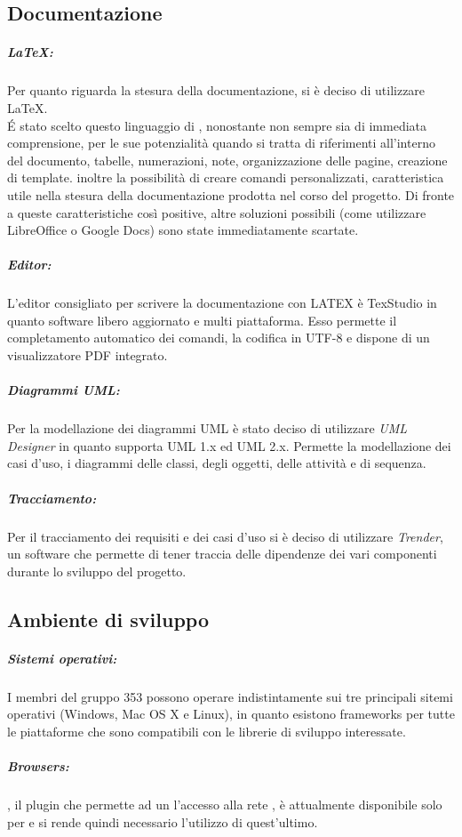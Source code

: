 \documentclass[NormeDiProgetto.tex]{subfiles}
\begin{document}
	\subsection{Documentazione}
	\subparagraph{\LaTeX:} Per quanto riguarda la stesura della documentazione, si è deciso di
		utilizzare \LaTeX. \\
		\'{E}	stato scelto questo linguaggio di , nonostante
		non sempre sia di immediata comprensione, per le sue potenzialità quando
		si tratta di riferimenti all'interno del documento, tabelle, numerazioni,
		note, organizzazione delle pagine, creazione di template. inoltre
		la possibilità di creare comandi personalizzati, caratteristica utile nella
		stesura della documentazione prodotta nel corso del progetto. Di fronte a
		queste caratteristiche così positive, altre soluzioni possibili (come utilizzare
		LibreOffice o Google Docs) sono state immediatamente scartate.
	\subparagraph{Editor:} L'editor consigliato per scrivere la documentazione con LATEX è
		TexStudio in quanto software libero aggiornato e multi piattaforma. Esso
		permette il completamento automatico dei comandi, la codifica in UTF-8 e
		dispone di un visualizzatore PDF integrato.
	\subparagraph{Diagrammi UML:} Per la modellazione dei diagrammi UML è stato deciso di utilizzare 	\emph{UML Designer} in quanto supporta UML 1.x ed UML 2.x. Permette la modellazione dei casi d'uso, i 	diagrammi delle classi, degli oggetti, delle attività	e di sequenza.
	\subparagraph{Tracciamento:} Per il tracciamento dei requisiti e dei casi d'uso si è deciso di utilizzare \emph{Trender}, un software che permette di tener traccia delle dipendenze dei vari componenti durante lo sviluppo del progetto.
	\subsection{Ambiente di sviluppo}
	\subparagraph{Sistemi operativi:} I membri del gruppo 353 possono operare indistintamente sui tre 		principali sitemi operativi (Windows, Mac OS X e Linux), in quanto esistono frameworks per tutte le piattaforme che sono compatibili con le librerie di sviluppo interessate.
	\subparagraph{Browsers:} , il plugin che permette ad un  l'accesso alla rete , è attualmente disponibile solo per  e si rende quindi necessario l'utilizzo di quest'ultimo.
\end{document}
